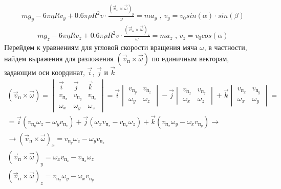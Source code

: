 \documentclass[a5paper, 10pt]{article}
\theoremstyle{definition}
\theoremstyle{plain}
\theoremstyle{remark}
\begin{document}
\begin{multline}
m g_{y} - 6 \pi  \eta R v_{y} +0.6 \pi \rho  R^{2} v  \cdot  \frac{  \left( \vec{v}_{\text{п}} \times \vec{\omega} \right)_{y}}{  \omega} = m a_{y} \text{ , } v_{y} = v_0 sin \left( \alpha \right) \cdot sin  \left( \beta \right)
\end{multline}
\begin{multline}
m g_{z} - 6 \pi  \eta R v_{z} +0.6 \pi \rho  R^{2} v  \cdot  \frac{  \left( \vec{v}_{\text{п}} \times \vec{\omega} \right)_{z}}{  \omega} = m a_{z} \text{ , } v_{z} = v_0 cos \left( \alpha \right)
\end{multline}
Перейдем к уравнениям для угловой скорости вращения мяча $ \omega $, в частности, найдем выражения для разложения   $ \left( \vec{v}_{\text{п}} \times \vec{\omega} \right) $ по единичным векторам, задающим оси координат, $ \vec{i}$, $ \vec{j}$ и $ \vec{k}$
\begin{multline}
\left( \vec{v}_{\text{п}} \times \vec{\omega} \right) = 
\begin{vmatrix}
\vec{i} & \vec{j} & \vec{k} \\
v_{\text{п}_{x}} & v_{\text{п}_{y}} & v_{\text{п}_{z}} \\
\omega _{x} & \omega _{y} & \omega _{z}
\end{vmatrix}
= \vec{i} 
\begin{vmatrix}
 v_{\text{п}_{y}} & v_{\text{п}_{z}} \\
\omega _{y} & \omega _{z}
\end{vmatrix}
- \vec{j}
\begin{vmatrix}
 v_{\text{п}_{x}} & v_{\text{п}_{z}} \\
\omega _{x} & \omega _{z}
\end{vmatrix}
+ \vec{k}
\begin{vmatrix}
 v_{\text{п}_{x}} & v_{\text{п}_{y}} \\
\omega _{x} & \omega _{y}
\end{vmatrix}
=\\
= \vec{i}  \left( v_{\text{п}_{y}} \omega _{z} - \omega _{y} v_{\text{п}_{z}} \right) + \vec{j} \left( \omega _{x} v_{\text{п}_{z}} - v_{\text{п}_{x}} \omega _{z} \right) + \vec{k} \left(  v_{\text{п}_{x}} \omega _{y} - \omega _{x} v_{\text{п}_{y}} \right) \to \\
\to \left( \vec{v}_{\text{п}} \times \vec{\omega} \right)_{x} = v_{\text{п}_{y}} \omega _{z} - \omega _{y} v_{\text{п}_{z}}\\
 \left( \vec{v}_{\text{п}} \times \vec{\omega} \right)_{y} = \omega _{x} v_{\text{п}_{z}} - v_{\text{п}_{x}} \omega _{z}\\
 \left( \vec{v}_{\text{п}} \times \vec{\omega} \right)_{z} =  v_{\text{п}_{x}} \omega _{y} - \omega _{x} v_{\text{п}_{y}}\\
\end{multline}
\end{document}
